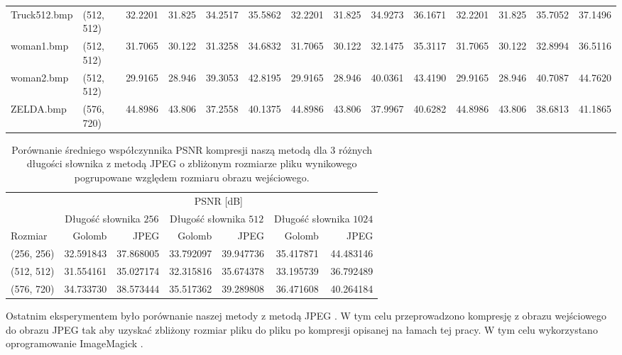 \documentclass{article}
\begin{document}
\begin{table}[H]
\begin{adjustbox}{center}
\begin{tabular}{llrrrrrrrrrrrr}
      Truck512.bmp &  (512, 512) &   32.2201 &    31.825 &   34.2517 &   35.5862 &   32.2201 &    31.825 &   34.9273 &   36.1671 &   32.2201 &    31.825 &   35.7052 &   37.1496 \\
        woman1.bmp &  (512, 512) &   31.7065 &    30.122 &   31.3258 &   34.6832 &   31.7065 &    30.122 &   32.1475 &   35.3117 &   31.7065 &    30.122 &   32.8994 &   36.5116 \\
        woman2.bmp &  (512, 512) &   29.9165 &    28.946 &   39.3053 &   42.8195 &   29.9165 &    28.946 &   40.0361 &   43.4190 &   29.9165 &    28.946 &   40.7087 &   44.7620 \\
         ZELDA.bmp &  (576, 720) &   44.8986 &    43.806 &   37.2558 &   40.1375 &   44.8986 &    43.806 &   37.9967 &   40.6282 &   44.8986 &    43.806 &   38.6813 &   41.1865 \\
\bottomrule
\end{tabular}
\end{adjustbox}
\end{table}



\begin{table}[H]
  \caption{Porównanie średniego współczynnika PSNR kompresji naszą metodą dla 3 różnych długości słownika z metodą JPEG o zbliżonym rozmiarze pliku wynikowego pogrupowane względem rozmiaru obrazu wejściowego.}
  \label{tab:jpg_summary}
  \centering
\begin{tabular}{lrrrrrr}
\toprule
{} & \multicolumn{6}{c}{PSNR [dB]} \\
\cmidrule(lr){2-7}
{} & \multicolumn{2}{c}{Długość słownika $256$} & \multicolumn{2}{c}{Długość słownika $512$} & \multicolumn{2}{c}{Długość słownika $1024$} \\
\cmidrule(lr){2-3}
\cmidrule(lr){4-5}
\cmidrule(lr){6-7}
Rozmiar &   Golomb &   JPEG &   Golomb &   JPEG &   Golomb &   JPEG \\
\midrule
(256, 256) &  32.591843 &  37.868005 &  33.792097 &  39.947736 &  35.417871 &  44.483146 \\
(512, 512) &  31.554161 &  35.027174 &  32.315816 &  35.674378 &  33.195739 &  36.792489 \\
(576, 720) &  34.733730 &  38.573444 &  35.517362 &  39.289808 &  36.471608 &  40.264184 \\
\bottomrule
\end{tabular}
\end{table}

\newpage

Ostatnim eksperymentem było porównanie naszej metody z metodą JPEG \cite{jpeg}. W tym celu przeprowadzono kompresję z obrazu wejściowego do obrazu JPEG tak aby uzyskać zbliżony rozmiar pliku do pliku po kompresji opisanej na łamach tej pracy. W tym celu wykorzystano oprogramowanie ImageMagick \cite{imagemagick}.
\end{document}
